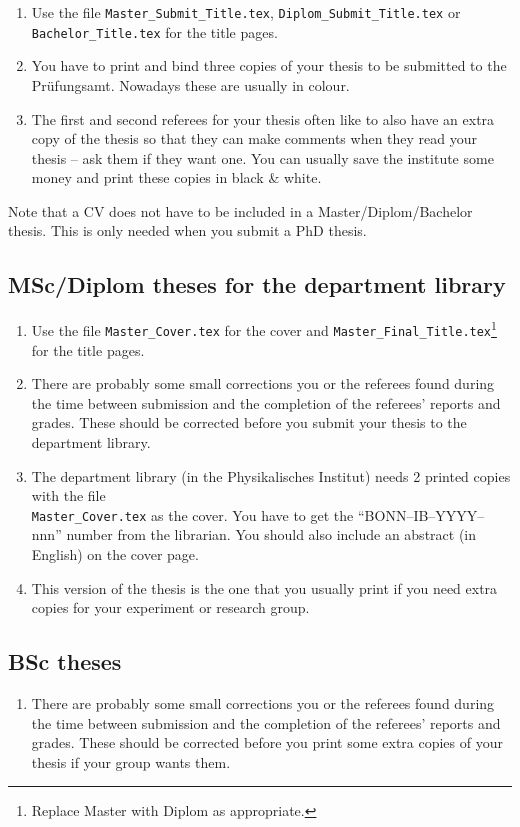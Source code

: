 \begin{enumerate}
\item Use the file \texttt{Master\_Submit\_Title.tex},
  \texttt{Diplom\_Submit\_Title.tex} or
  \texttt{Bachelor\_Title.tex} for the title pages.
\item You have to print and bind three copies of your thesis
  to be submitted to the
  \foreignlanguage{ngerman}{Prüfungsamt}. Nowadays these are usually in
  colour.
\item The first and second referees for your thesis often like to also
  have an extra copy of the thesis so that they can make comments when they read
  your thesis -- ask them if they want one. You can usually save the
  institute some money and print these copies in black \& white.
\end{enumerate}

Note that a CV does not have to be included in a Master/Diplom/Bachelor
thesis. This is only needed when you submit a PhD thesis.


\subsection{MSc/Diplom theses for the department library}

\begin{enumerate}
\item Use the file \texttt{Master\_Cover.tex} for the cover and
  \texttt{Master\_Final\_Title.tex}\footnote{Replace Master with Diplom
    as appropriate.} for the title pages.
\item There are probably some small corrections you or the referees
  found during the time between submission and the completion of the
  referees' reports and grades. These should be corrected before you
  submit your thesis to the department library.
\item The department
  library (in the Physikalisches
  Institut) needs 2 printed copies with the file\\
  \texttt{Master\_Cover.tex} as the cover. You have to get
  the \enquote{BONN--IB--YYYY--nnn} number from the librarian. You
  should also include an abstract (in English) on the cover page.
\item This version of the thesis is the one that you usually print if
  you need extra copies for your experiment or research group.
\end{enumerate}


\subsection{BSc theses}

\begin{enumerate}
\item There are probably some small corrections you or the referees
  found during the time between submission and the completion of the
  referees' reports and grades. These should be corrected before you
  print some extra copies of your thesis if your group wants them.
\end{enumerate}

